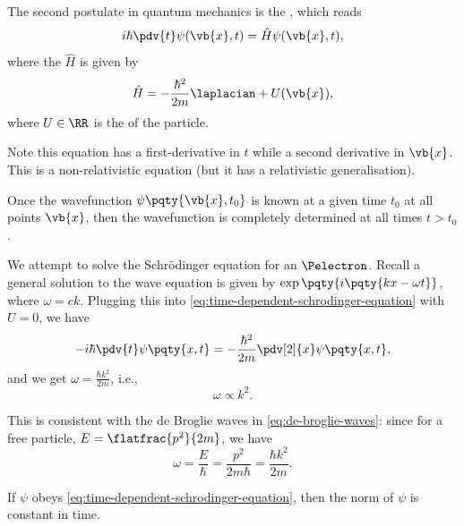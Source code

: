 The second postulate in quantum mechanics is the , which reads
\begin{equation}
    \label{eq:time-dependent-schrodinger-equation}%
    i\hbar \pdv{t} \psi(\vb{x}, t) = \hat{H} \psi(\vb{x}, t),
\end{equation}
where the  \(\hat{H}\) is given by
\begin{equation}
    \label{eq:hamiltonian-operator}%
    \hat{H} = -\frac{\hbar^2}{2m} \laplacian + U(\vb{x}),
\end{equation}
where \(U \in \RR\) is the  of the particle.

Note this equation has a first-derivative in \(t\) while a second derivative in \(\vb{x}\). This is a non-relativistic equation (but it has a relativistic generalisation).

Once the wavefunction \(\psi\pqty{\vb{x}, t_0}\) is known at a given time \(t_0\) at all points \(\vb{x}\), then the wavefunction is completely determined at all times \(t > t_0\).

We attempt to solve the Schr\"odinger equation for an \(\Pelectron\). Recall a general solution to the wave equation is given by \(\exp\pqty{i\pqty{kx - \omega t}}\), where \(\omega = ck\). Plugging this into \eqref{eq:time-dependent-schrodinger-equation} with \(U = 0\), we have
\begin{equation}
    - i \hbar \pdv{t} \psi\pqty{x, t} = - \frac{\hbar^2}{2m} \pdv[2]{x} \psi\pqty{x, t},
\end{equation}
and we get \(\omega = \frac{\hbar k^2}{2m}\), i.e.,
\begin{equation}
    \omega \propto k^2.
\end{equation}

This is consistent with the de Broglie waves in \eqref{eq:de-broglie-waves}: since for a free particle, \(E = \flatfrac{p^2}{2m}\), we have
\begin{equation}
    \omega = \frac{E}{\hbar} = \frac{p^2}{2 m \hbar} = \frac{\hbar k^2}{2 m}.
\end{equation}

\begin{proposition}
    If \(\psi\) obeys \eqref{eq:time-dependent-schrodinger-equation}, then the norm of \(\psi\) is constant in time.
\end{proposition}

